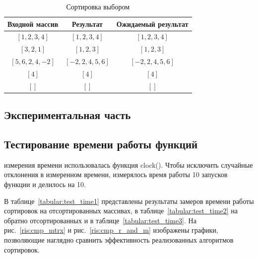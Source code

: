 \documentclass[a4paper,12pt]{article}
\begin{document}
					\begin{table}[H]        		
       				\caption{\label{tabular:test_mtrx_dl} Сортировка выбором}
       				\begin{center}       			
        			\begin{tabular}{|c|c|c|}        				
        				\hline
						Входной массив & Результат & Ожидаемый результат \\ 
						\hline
        				$[1,2,3,4]$ & $[1,2,3,4]$  & $[1,2,3,4]$\\
        				$[3,2,1]$  & $[1,2,3]$ & $[1,2,3]$\\
        				$[5,6,2,4,-2]$  & $[-2,2,4,5,6]$  & $[-2,2,4,5,6]$\\
        				$[4]$  & $[4]$  & $[4]$\\
        				$[]$  & $[]$  & $[]$\\
        				\hline
        			\end{tabular}
     	 				\end{center}
	        		\end{table}
	\newpage

    \begin{center}
        \section{Экспериментальная часть}        
	    \subsection{Тестирование времени работы функций}	
	\end{center}
	     измерения времени использовалась функция clock(). Чтобы исключить случайные отклонения в измеренном времени, измерялось время работы 10 запусков функции и делилось на 10.
	    
	    В таблице~\ref{tabular:test_time1} представлены результаты замеров времени работы сортировок на отсортированных массивах, в таблице~\ref{tabular:test_time2} на обратно отсортированных и в таблице~\ref{tabular:test_time3}. На рис.~\ref{ris:cmp_mtrx} и рис.~\ref{ris:cmp_r_and_m} изображены графики, позволяющие наглядно сравнить эффективность реализованных алгоритмов сортировок.
	    
\end{document}
